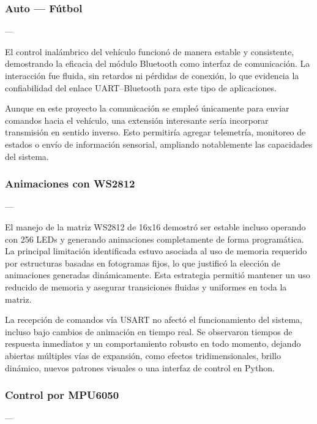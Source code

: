 \vspace{1em}
\subsubsection{\textbf{Auto — Fútbol}} ---

El control inalámbrico del vehículo funcionó de manera estable y consistente, demostrando la eficacia del módulo Bluetooth como interfaz de comunicación. La interacción fue fluida, sin retardos ni pérdidas de conexión, lo que evidencia la confiabilidad del enlace UART–Bluetooth para este tipo de aplicaciones.

\vspace{1em}

Aunque en este proyecto la comunicación se empleó únicamente para enviar comandos hacia el vehículo, una extensión interesante sería incorporar transmisión en sentido inverso. Esto permitiría agregar telemetría, monitoreo de estados o envío de información sensorial, ampliando notablemente las capacidades del sistema.


\subsubsection{\textbf{Animaciones con WS2812}} --- 

El manejo de la matriz WS2812 de 16x16 demostró ser estable incluso operando con 256 LEDs y generando animaciones completamente de forma programática. La principal limitación identificada estuvo asociada al uso de memoria requerido por estructuras basadas en fotogramas fijos, lo que justificó la elección de animaciones generadas dinámicamente. Esta estrategia permitió mantener un uso reducido de memoria y asegurar transiciones fluidas y uniformes en toda la matriz.

\vspace{1em}

La recepción de comandos vía USART no afectó el funcionamiento del sistema, incluso bajo cambios de animación en tiempo real. Se observaron tiempos de respuesta inmediatos y un comportamiento robusto en todo momento, dejando abiertas múltiples vías de expansión, como efectos tridimensionales, brillo dinámico, nuevos patrones visuales o una interfaz de control en Python.

\vspace{1.5em}

\subsubsection{\textbf{Control por MPU6050}} --- 

